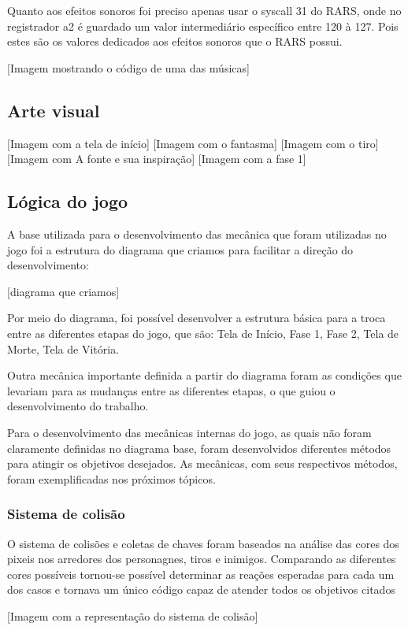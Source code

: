 \documentclass[conference]{IEEEtran}
\begin{document}
Quanto aos efeitos sonoros foi preciso apenas usar o syscall 31 do RARS, onde no registrador a2 é guardado um valor intermediário específico entre 120 à 127. Pois estes são os valores dedicados aos efeitos sonoros que o RARS possui.

[Imagem mostrando o código de uma das músicas] 

\subsection{Arte visual}

[Imagem com a tela de início]
[Imagem com o fantasma]
[Imagem com o tiro]
[Imagem com A fonte e sua inspiração]
[Imagem com a fase 1]

\subsection{Lógica do jogo}

A base utilizada para o desenvolvimento das mecânica que foram utilizadas no jogo foi a estrutura do diagrama que criamos para facilitar a direção do desenvolvimento:

[diagrama que criamos]

Por meio do diagrama, foi possível desenvolver a estrutura básica para a troca entre as diferentes etapas do jogo, que são: Tela de Início, Fase 1, Fase 2, Tela de Morte, Tela de Vitória.

Outra mecânica importante definida a partir do diagrama foram as condições que levariam para as mudanças entre as diferentes etapas, o que guiou o desenvolvimento do trabalho.

Para o desenvolvimento das mecânicas internas do jogo, as quais não foram claramente definidas no diagrama base, foram desenvolvidos diferentes métodos para atingir os objetivos desejados. As mecânicas, com seus respectivos métodos, foram exemplificadas nos próximos tópicos.

\subsubsection{Sistema de colisão}
 O sistema de colisões e coletas de chaves foram baseados na análise das cores dos pixeis nos arredores dos personagnes, tiros e inimigos. Comparando as diferentes cores possíveis tornou-se possível determinar as reações esperadas para cada um dos casos e tornava um único código capaz de atender todos os objetivos citados

[Imagem com a representação do sistema de colisão]
\end{document}
